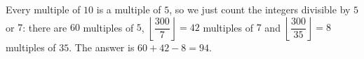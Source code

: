 Every multiple of $10$ is a multiple of $5$, so we just count the integers divisible by $5$ or $7$: there are $60$ multiples of $5$, $\left\lfloor\dfrac{300}{7}\right\rfloor=42$ multiples of $7$ and $\left\lfloor\dfrac{300}{35}\right\rfloor=8$ multiples of $35$. The answer is $60+42-8=\boxed{94}$.
